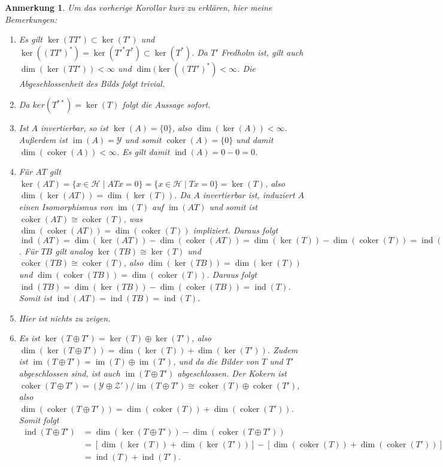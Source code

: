 \documentclass[11pt, hidelinks]{article}
\newcommand{\ind}{\operatorname{ind}}
\newcommand{\im}{\operatorname{im}}
\newcommand{\coker}{\operatorname{coker}}
\numberwithin{conj}{section}
\newtheorem{remark}[conj]{Anmerkung}
\begin{document}
\begin{remark}
Um das vorherige Korollar kurz zu erklären, hier meine Bemerkungen:
    \begin{enumerate}
        \item Es gilt $\ker(TT') \subset \ker(T')$ und $\ker((TT')^\ast) = \ker(T'^\ast T^\ast) \subset \ker(T^\ast)$. Da $T'$ Fredholm ist, gilt auch $\dim(\ker(TT')) < \infty$ und $\dim(\ker((TT')^\ast) < \infty$. Die Abgeschlossenheit des Bilds folgt trivial.
        \item Da $ker(T^{\ast\ast}) = \ker(T)$ folgt die Aussage sofort.
        \item Ist $A$ invertierbar, so ist $\ker(A) = \{0\}$, also $\dim(\ker(A)) < \infty$. Außerdem ist $\im(A) = \mathcal{Y}$ und somit $\coker(A) = \{0\}$ und damit $\dim(\coker(A)) < \infty$. Es gilt damit $\ind(A) = 0 - 0 = 0$.
        \item Für $AT$ gilt $\ker(AT) = \{ x \in \mathcal{H} \mid ATx = 0 \} = \{ x \in \mathcal{H} \mid Tx = 0 \} = \ker(T)$, also $\dim(\ker(AT)) = \dim(\ker(T))$. Da $A$ invertierbar ist, induziert $A$ einen Isomorphismus von $\operatorname{im}(T)$ auf $\operatorname{im}(AT)$ und somit ist $\operatorname{coker}(AT) \cong \operatorname{coker}(T)$, was $\dim(\operatorname{coker}(AT)) = \dim(\operatorname{coker}(T))$ impliziert. Daraus folgt $\operatorname{ind}(AT) = \dim(\ker(AT)) - \dim(\operatorname{coker}(AT)) = \dim(\ker(T)) - \dim(\operatorname{coker}(T)) = \operatorname{ind}(T)$. Für $TB$ gilt analog $\ker(TB) \cong \ker(T)$ und $\operatorname{coker}(TB) \cong \operatorname{coker}(T)$, also $\dim(\ker(TB)) = \dim(\ker(T))$ und $\dim(\operatorname{coker}(TB)) = \dim(\operatorname{coker}(T))$. Daraus folgt $\operatorname{ind}(TB) = \dim(\ker(TB)) - \dim(\operatorname{coker}(TB)) = \operatorname{ind}(T)$. Somit ist $\operatorname{ind}(AT) = \operatorname{ind}(TB) = \operatorname{ind}(T)$.
        \item Hier ist nichts zu zeigen.
        \item Es ist $\ker(T \oplus T') = \ker(T) \oplus \ker(T')$, also $\dim(\ker(T \oplus T')) = \dim(\ker(T)) + \dim(\ker(T'))$. Zudem ist $\operatorname{im}(T \oplus T') = \operatorname{im}(T) \oplus \operatorname{im}(T')$, und da die Bilder von $T$ und $T'$ abgeschlossen sind, ist auch $\operatorname{im}(T \oplus T')$ abgeschlossen. Der Kokern ist $\operatorname{coker}(T \oplus T') = (\mathcal{Y} \oplus \mathcal{Z}') / \operatorname{im}(T \oplus T') \cong \operatorname{coker}(T) \oplus \operatorname{coker}(T')$, also $\dim(\operatorname{coker}(T \oplus T')) = \dim(\operatorname{coker}(T)) + \dim(\operatorname{coker}(T'))$. Somit folgt
        \begin{align}
        \operatorname{ind}(T \oplus T') &= \dim(\ker(T \oplus T')) - \dim(\operatorname{coker}(T \oplus T')) \nonumber\\
        &= [\dim(\ker(T)) + \dim(\ker(T'))] - [\dim(\operatorname{coker}(T)) + \dim(\operatorname{coker}(T'))] \nonumber\\
        &= \operatorname{ind}(T) + \operatorname{ind}(T').
        \end{align}
    \end{enumerate}
\end{remark}
\end{document}
